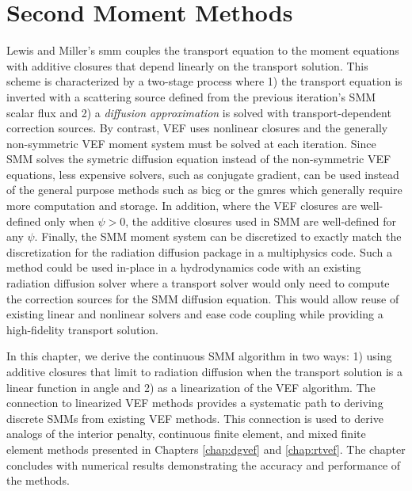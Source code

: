 \documentclass[../doc.tex]{subfiles}
\begin{document}
\chapter{Second Moment Methods} \label{chap:smm}
Lewis and Miller's \gls{smm} \cite{lewis_miller} couples the transport equation to the moment equations with additive closures that depend linearly on the transport solution. This scheme is characterized by a two-stage process where 1) the transport equation is inverted with a scattering source defined from the previous iteration's SMM scalar flux and 2) a \emph{diffusion approximation} is solved with transport-dependent correction sources. By contrast, VEF uses nonlinear closures and the generally non-symmetric VEF moment system must be solved at each iteration. Since SMM solves the symetric diffusion equation instead of the non-symmetric VEF equations, less expensive solvers, such as conjugate gradient, can be used instead of the general purpose methods such as \gls{bicg} or the \gls{gmres} which generally require more computation and storage. In addition, where the VEF closures are well-defined only when $\psi>0$, the additive closures used in SMM are well-defined for any $\psi$. Finally, the SMM moment system can be discretized to exactly match the discretization for the radiation diffusion package in a multiphysics code. Such a method could be used in-place in a hydrodynamics code with an existing radiation diffusion solver where a transport solver would only need to compute the correction sources for the SMM diffusion equation. 
This would allow reuse of existing linear and nonlinear solvers and ease code coupling while providing a high-fidelity transport solution. 

In this chapter, we derive the continuous SMM algorithm in two ways: 1) using additive closures that limit to radiation diffusion when the transport solution is a linear function in angle and 2) as a linearization of the VEF algorithm. The connection to linearized VEF methods provides a systematic path to deriving discrete SMMs from existing VEF methods. This connection is used to derive analogs of the interior penalty, continuous finite element, and mixed finite element methods presented in Chapters \ref{chap:dgvef} and \ref{chap:rtvef}. The chapter concludes with numerical results demonstrating the accuracy and performance of the methods. 
\end{document}
